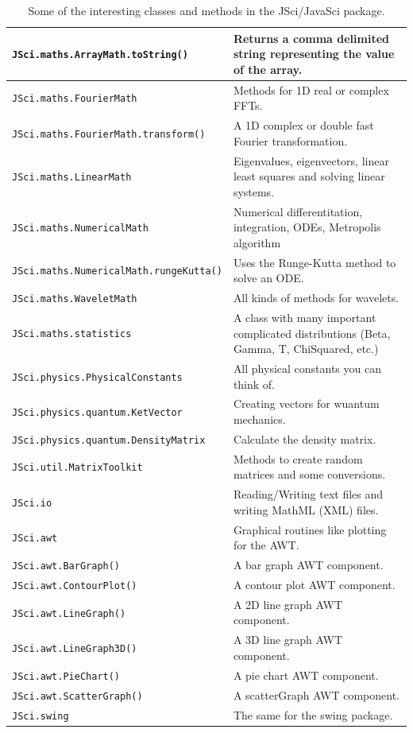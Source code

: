 \begin{landscape}
\begin{table}[htbp]
\begin{center}
\begin{tabular}{ll}
 \verb|JSci.maths.ArrayMath.toString()| & 
  Returns a comma delimited string representing the value of the array. \\\hline
\verb|JSci.maths.FourierMath| & Methods for 1D real or complex FFTs.\\
\verb|JSci.maths.FourierMath.transform()| & A 1D complex or double fast 
        Fourier transformation.\\\hline
\verb|JSci.maths.LinearMath| & Eigenvalues, eigenvectors, linear least squares
           and solving linear systems.\\\hline
\verb|JSci.maths.NumericalMath| &  Numerical differentitation, integration, 
        ODEs, Metropolis algorithm \\
\verb|JSci.maths.NumericalMath.rungeKutta()| & Uses the Runge-Kutta 
              method to solve an ODE.\\\hline
\verb|JSci.maths.WaveletMath| & All kinds of methods for wavelets.\\\hline
\verb|JSci.maths.statistics| & A class with many important complicated 
              distributions (Beta, Gamma, T, ChiSquared, etc.)\\\hline
\verb|JSci.physics.PhysicalConstants| & All physical constants you 
                               can think of.\\\hline
\verb|JSci.physics.quantum.KetVector| & Creating vectors for wuantum 
             mechanics.\\
\verb|JSci.physics.quantum.DensityMatrix| & Calculate the density matrix.\\\hline
\verb|JSci.util.MatrixToolkit| & Methods to create random matrices 
                 and some conversions.\\\hline
\verb|JSci.io| & Reading/Writing text files and writing MathML (XML) files.\\\hline
\verb|JSci.awt| & Graphical routines like plotting for the AWT.\\
\verb|JSci.awt.BarGraph()| & A bar graph AWT component. \\
\verb|JSci.awt.ContourPlot()| & A contour plot AWT component. \\
\verb|JSci.awt.LineGraph()| & A 2D line graph AWT component. \\
\verb|JSci.awt.LineGraph3D()| & A 3D line graph AWT component. \\
\verb|JSci.awt.PieChart()| & A pie chart AWT component. \\
\verb|JSci.awt.ScatterGraph()| & A scatterGraph AWT component. \\\hline
\verb|JSci.swing| & The same for the swing package.\\
     \end{tabular}
    \caption{Some of the interesting classes and methods in %
      the JSci/JavaSci package.}
    \label{tab:JSciClasses}
  \end{center}
\end{table}
\end{landscape}
